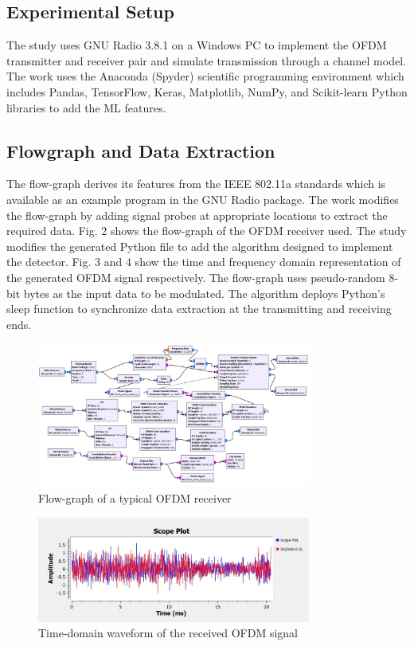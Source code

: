 \documentclass[conference]{IEEEtran}
\begin{document}
\subsection{Experimental Setup}
The study uses GNU Radio 3.8.1 on a Windows PC to implement the OFDM transmitter and receiver pair and simulate transmission through a channel model. The work uses the Anaconda (Spyder) scientific programming environment which includes Pandas, TensorFlow, Keras, Matplotlib, NumPy, and Scikit-learn Python libraries to add the ML features.  


\subsection{Flowgraph and Data Extraction}
 The flow-graph derives its features from the IEEE 802.11a standards \cite{b5} which is available as an example program in the GNU Radio package. The work modifies the flow-graph by adding signal probes at appropriate locations to extract the required data. Fig. 2 shows the flow-graph of the OFDM receiver used. The study modifies the generated Python file to add the algorithm designed to implement the detector. Fig. 3 and 4 show the time and frequency domain representation of the generated OFDM signal respectively. The flow-graph uses pseudo-random 8-bit bytes as the input data to be modulated. The algorithm deploys Python's sleep function to synchronize data extraction at the transmitting and receiving ends.
 
\begin{figure}[htbp]
\centerline{\includegraphics[width=9cm]{tx_ofdm.png}}
\caption{Flow-graph of a typical OFDM receiver}
\label{flowgraph}
\end{figure}

\begin{figure}[htbp]
\centerline{\includegraphics[width=9cm]{waveform.jpg}}
\caption{Time-domain waveform of the received OFDM signal}
\label{waveform}
\end{figure}
\end{document}
